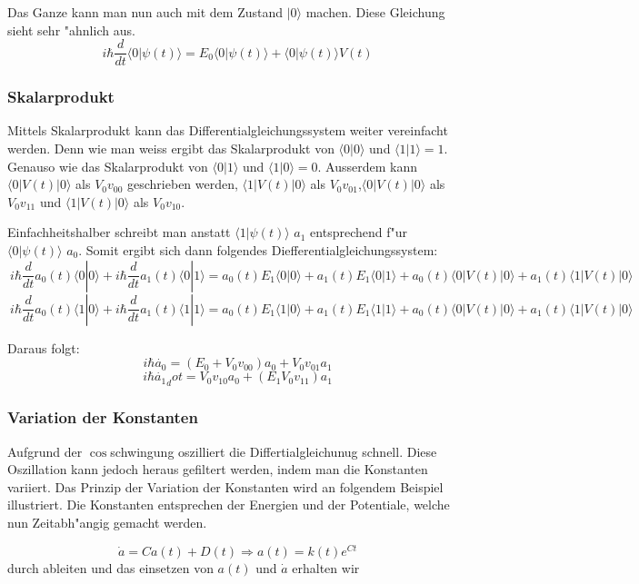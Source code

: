 \begin{refsection}
Das Ganze kann man nun auch mit dem Zustand $|0\rangle$ machen. Diese
Gleichung sieht sehr "ahnlich aus.
\[
\ i\hbar\frac{d}{dt}\langle0|\psi(t)\rangle = E_{0}\langle0|\psi(t)\rangle+\langle0|\psi(t)\rangle V(t)
\]

\subsubsection{Skalarprodukt}
Mittels Skalarprodukt kann das Differentialgleichungssystem weiter
vereinfacht werden.
Denn wie man weiss ergibt das Skalarprodukt von $\langle0|0\rangle$
und $\langle1|1\rangle = 1$. Genauso wie das Skalarprodukt von
$\langle0|1\rangle$ und $\langle1|0\rangle = 0$.
Ausserdem kann  $\langle0|V(t)|0\rangle$ als $V_{0}v_{00}$
geschrieben werden, $\langle1|V(t)|0\rangle$ als
$V_{0}v_{01}$,$\langle0|V(t)|0\rangle$ als $V_{0}v_{11}$ und
$\langle1|V(t)|0\rangle$ als $V_{0}v_{10}$.

Einfachheitshalber schreibt man anstatt $\langle1|\psi(t)\rangle$ $a_1$
entsprechend f"ur $\langle0|\psi(t)\rangle$ $a_0$. Somit ergibt sich
dann folgendes Diefferentialgleichungssystem:
\[
\ i\hbar\frac{d}{dt}a_{0}(t)\langle0|0\rangle +i\hbar\frac{d}{dt}a_{1}(t)\langle0|1\rangle = a_{0}(t)E_{1}\langle0|0\rangle + a_{1}(t)E_{1}\langle0|1\rangle + a_{0}(t)\langle0|V(t)|0\rangle+ a_{1}(t)\langle1|V(t)|0\rangle
\]
\[
\ i\hbar\frac{d}{dt}a_{0}(t)\langle1|0\rangle +i\hbar\frac{d}{dt}a_{1}(t)\langle1|1\rangle = a_{0}(t)E_{1}\langle1|0\rangle + a_{1}(t)E_{1}\langle1|1\rangle + a_{0}(t)\langle0|V(t)|0\rangle+ a_{1}(t)\langle1|V(t)|0\rangle
\]

Daraus folgt:
\[
\ i\hbar\dot{a_{0}} = (E_{0} + V_{0} v_{00}) a_{0} + V_{0} v_{01} a_{1}
\]
\[
\ i\hbar\dot{a_{1}}_dot = V_{0} v_{10} a_{0} + (E_{1} V_{0} v_{11}) a_{1}
\]

\subsubsection{Variation der Konstanten}
Aufgrund der $\cos$schwingung oszilliert die Differtialgleichunug
schnell. Diese Oszillation kann jedoch heraus gefiltert werden, indem
man die Konstanten variiert. Das Prinzip der Variation der Konstanten
wird an folgendem Beispiel illustriert. Die Konstanten entsprechen der
Energien und der Potentiale, welche nun Zeitabh"angig gemacht werden.

\[
\ \dot{a} = C a(t) + D(t) \Rightarrow a(t) = k(t) e^{C t}
\] 
durch ableiten und das einsetzen von $ a(t)$ und  $ \dot{a} $ erhalten wir


\end{refsection}
